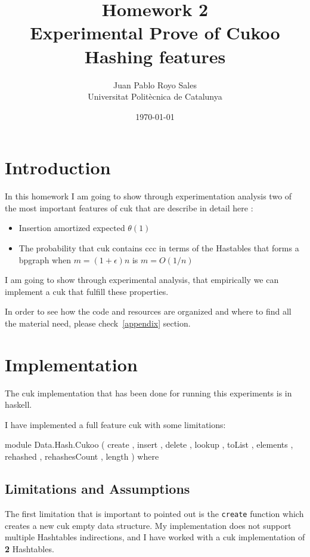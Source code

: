 \documentclass[12pt, a4paper]{article}
\title{%
      Homework 2 \\
      Experimental Prove of Cukoo Hashing features
}
\author{%
  Juan Pablo Royo Sales \\
  \small{Universitat Politècnica de Catalunya}
}
\date\today
\begin{document}
\maketitle

\section{Introduction}
In this homework I am going to show through experimentation analysis two of the most important features of \acrfull{cuk} that are describe in detail here \cite{cukoo}:

\begin{itemize}
  \item Insertion amortized expected $\theta(1)$
  \item The probability that \acrshort{cuk} contains \acrfull{ccc} in terms of the Hastables that forms a \acrfull{bpgraph} when $m = (1+\epsilon)n$ is $m =O(1/n)$ \cite{kutze}
\end{itemize}

I am going to show through experimental analysis, that empirically we can implement a \acrshort{cuk} that fulfill these properties.

In order to see how the code and resources are organized and where to find all the material need, please check~\ref{appendix} section.

\section{Implementation}
The \acrshort{cuk} implementation that has been done for running this experiments is in \acrfull{haskell}.

I have implemented a full feature \acrshort{cuk} with some limitations:

\begin{haskellcode*}{}
module Data.Hash.Cukoo
  ( create
  , insert
  , delete
  , lookup
  , toList
  , elements
  , rehashed
  , rehashesCount
  , length
  ) where
\end{haskellcode*}

\subsection{Limitations and Assumptions}
The first limitation that is important to pointed out is the \texttt{create} function which creates a new \acrshort{cuk} empty data structure. My implementation does not support multiple Hashtables indirections, and I have worked with a \acrshort{cuk} implementation of \textbf{2} Hashtables.
\end{document}
